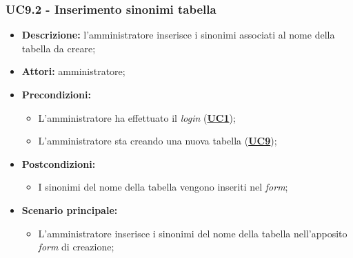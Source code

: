 \subsubsection{UC9.2 - Inserimento sinonimi tabella}
\label{sec:UC9.2}
\begin{itemize}
	\item \textbf{Descrizione:} l’amministratore inserisce i sinonimi associati al nome della tabella da creare;
	\item \textbf{Attori:} amministratore;
	\item \textbf{Precondizioni:} 
	\begin{itemize}
		\item L’amministratore ha effettuato il \textit{login} (\hyperref[sec:UC1]{\textbf{UC1}});
		\item L’amministratore sta creando una nuova tabella (\hyperref[sec:UC9]{\textbf{UC9}});
	\end{itemize}
	\item \textbf{Postcondizioni:} 
	\begin{itemize}
		\item I sinonimi del nome della tabella vengono inseriti nel \textit{form};
	\end{itemize}
	\item \textbf{Scenario principale:} 
	\begin{itemize}
		\item L’amministratore inserisce i sinonimi del nome della tabella nell'apposito \textit{form} di creazione;
	\end{itemize}
\end{itemize}

